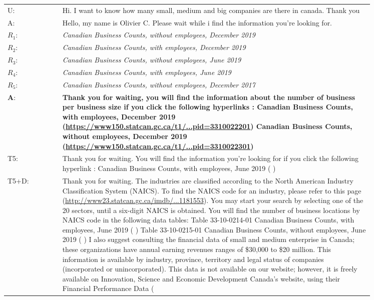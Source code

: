 \documentclass[11pt]{article}
\begin{document}
\begin{table*}[h]
    \small
    \centering
    \begin{tabular}{l p{0.85\linewidth}}
    \toprule
    U: & Hi. I want to know how many small, medium and big companies are there in canada. Thank you
    \\
    A: & Hello, my name is Olivier C. Please wait while i find the information you're looking for.
    \\
    
    $R_1$: & \textit{Canadian Business Counts, without employees, December 2019}
    \\
    $R_2$: & \textit{Canadian Business Counts, with employees, December 2019}
    \\
    $R_3$: & \textit{Canadian Business Counts, without employees, June 2019}
    \\
    $R_4$: & \textit{Canadian Business Counts, with employees, June 2019}
    \\
    $R_5$: & \textit{Canadian Business Counts, without employees, December 2017}
    \\
    \midrule
    \textbf{A}: & \textbf{Thank you for waiting, you will find the information about the number of business per business size if you click the following hyperlinks : Canadian Business Counts, with employees, December 2019 (\href{https://www150.statcan.gc.ca/t1/tbl1/en/tv.action?pid=3310022201}{https://www150.statcan.gc.ca/t1/...pid=3310022201}) Canadian Business Counts, without employees, December 2019 (\href{https://www150.statcan.gc.ca/t1/tbl1/en/tv.action?pid=3310022301}{https://www150.statcan.gc.ca/t1/...pid=3310022301})}
    \\
    T5: & Thank you for waiting. You will find the information you're looking for if you click the following hyperlink : Canadian Business Counts, with employees, June 2019 ( )
    \\
    T5+D: & Thank you for waiting. The industries are classified according to the North American Industry Classification System (NAICS). To find the NAICS code for an industry, please refer to this page (\href{http://www23.statcan.gc.ca/imdb/p3VD.pl?Function=getVD&TVD=1181553}{http://www23.statcan.gc.ca/imdb/...1181553}). You may start your search by selecting one of the 20 sectors, until a six-digit NAICS is obtained. You will find the number of business locations by NAICS code in the following data tables: Table 33-10-0214-01 Canadian Business Counts, with employees, June 2019 ( ) Table 33-10-0215-01 Canadian Business Counts, without employees, June 2019 ( ) I also suggest consulting the financial data of small and medium enterprise in Canada; these organizations have annual earning revenues ranges of \$30,000 to \$20 million. This information is available by industry, province, territory and legal status of companies (incorporated or unincorporated). This data is not available on our website; however, it is freely available on Innovation, Science and Economic Development Canada's website, using their Financial Performance Data (

\end{tabular}
\end{table*}
\end{document}
